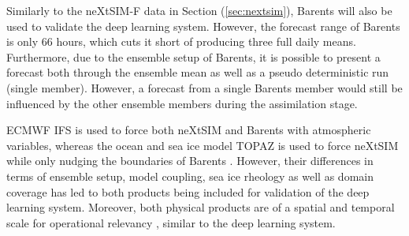 \documentclass[../main/thesis.tex]{subfiles}
\begin{document}
Similarly to the neXtSIM-F data in Section (\ref{sec:nextsim}), Barents will also be used to validate the deep learning system. However, the forecast range of Barents is only 66 hours, which cuts it short of producing three full daily means. Furthermore, due to the ensemble setup of Barents, it is possible to present a forecast both through the ensemble mean as well as a pseudo deterministic run (single member). However, a forecast from a single Barents member would still be influenced by the other ensemble members during the assimilation stage. 

ECMWF IFS is used to force both neXtSIM and Barents with atmospheric variables, whereas the ocean and sea ice model TOPAZ \citep{Sakov2012} is used to force neXtSIM \citep{Williams2021} while only nudging the boundaries of Barents \citep{Roehrs2022}. However, their differences in terms of ensemble setup, model coupling, sea ice rheology as well as domain coverage has led to both products being included for validation of the deep learning system. Moreover, both physical products are of a spatial and temporal scale for operational relevancy \citep{Wagner2020}, similar to the deep learning system. 





\biblio
\end{document}
